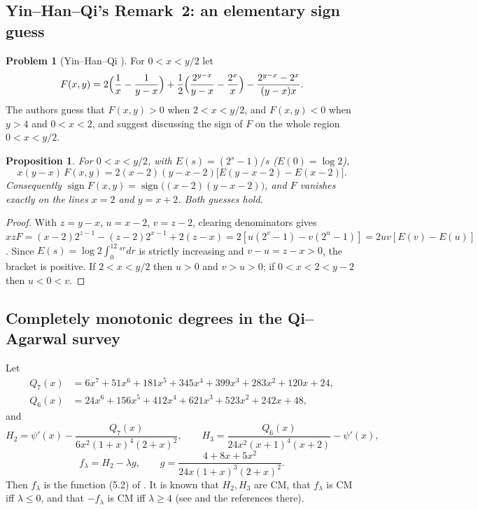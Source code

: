 \documentclass[11pt]{amsart}
\newtheorem{proposition}[theorem]{Proposition}
\theoremstyle{definition}
\newtheorem{problem}[theorem]{Problem}
\theoremstyle{remark}
\begin{document}
\subsection{Yin--Han--Qi's Remark~2: an elementary sign guess}
\label{R2:subsec:D}

\begin{problem}[{Yin--Han--Qi \cite[Lemma~3 and Remark~2]{R2-YHQ2024}}]\label{R2:prob:D}
For $0<x<y/2$ let
\[
 F(x,y)=2\Bigl(\frac1x-\frac1{y-x}\Bigr)+\frac12\Bigl(\frac{2^{y-x}}{y-x}-\frac{2^x}{x}\Bigr)
 -\frac{2^{y-x}-2^x}{(y-x)x}.
\]
The authors guess that $F(x,y)>0$ when $2<x<y/2$, and $F(x,y)<0$ when $y>4$
and $0<x<2$, and suggest discussing the sign of $F$ on the whole region
$0<x<y/2$.
\end{problem}

\begin{proposition}\label{R2:prop:D}
For $0<x<y/2$, with $E(s)=(2^s-1)/s$ ($E(0)=\log2$),
\[
 x(y-x)\,F(x,y)=2(x-2)(y-x-2)\bigl[E(y-x-2)-E(x-2)\bigr].
\]
Consequently
$\operatorname{sign}F(x,y)=\operatorname{sign}\bigl((x-2)(y-x-2)\bigr)$, and
$F$ vanishes exactly on the lines $x=2$ and $y=x+2$. Both guesses hold.
\end{proposition}
\begin{proof}
With $z=y-x$, $u=x-2$, $v=z-2$, clearing denominators gives
$xzF=(x-2)2^{z-1}-(z-2)2^{x-1}+2(z-x)=2[u(2^v-1)-v(2^u-1)]=2uv[E(v)-E(u)]$.
Since $E(s)=\log2\int_0^12^{sr}dr$ is strictly increasing and $v-u=z-x>0$,
the bracket is positive. If $2<x<y/2$ then $u>0$ and $v>u>0$; if
$0<x<2<y-2$ then $u<0<v$.
\end{proof}

\subsection{Completely monotonic degrees in the Qi--Agarwal survey}
\label{R2:subsec:EF}

Let
\begin{align*}
 Q_7(x)&=6x^7+51x^6+181x^5+345x^4+399x^3+283x^2+120x+24,\\
 Q_6(x)&=24x^6+156x^5+412x^4+621x^3+523x^2+242x+48,
\end{align*}
and
\[
 H_2=\psi'(x)-\frac{Q_7(x)}{6x^2(1+x)^4(2+x)^2},\qquad
 H_3=\frac{Q_6(x)}{24x^2(x+1)^4(x+2)}-\psi'(x),
\]
\[
 f_\lambda=H_2-\lambda g,\qquad g=\frac{4+8x+5x^2}{24x(1+x)^3(2+x)^2}.
\]
Then $f_\lambda$ is the function (5.2) of \cite{R2-QiAgarwal2019}. It is
known that $H_2,H_3$ are CM, that $f_\lambda$ is CM iff $\lambda\le0$, and
that $-f_\lambda$ is CM iff $\lambda\ge4$ (see
\cite[Sections~3.3, 5.4, 5.5]{R2-QiAgarwal2019} and the references there).
\end{document}

